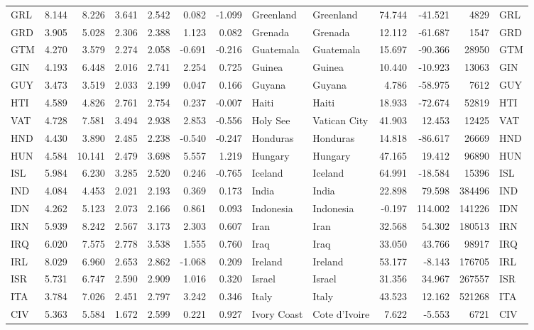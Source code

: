 \begin{tabular}{lrrrrrrllrrrl}
GRL & 8.144 & 8.226 & 3.641 & 2.542 & 0.082 & -1.099 & Greenland & Greenland & 74.744 & -41.521 & 4829 & GRL \\
GRD & 3.905 & 5.028 & 2.306 & 2.388 & 1.123 & 0.082 & Grenada & Grenada & 12.112 & -61.687 & 1547 & GRD \\
GTM & 4.270 & 3.579 & 2.274 & 2.058 & -0.691 & -0.216 & Guatemala & Guatemala & 15.697 & -90.366 & 28950 & GTM \\
GIN & 4.193 & 6.448 & 2.016 & 2.741 & 2.254 & 0.725 & Guinea & Guinea & 10.440 & -10.923 & 13063 & GIN \\
GUY & 3.473 & 3.519 & 2.033 & 2.199 & 0.047 & 0.166 & Guyana & Guyana & 4.786 & -58.975 & 7612 & GUY \\
HTI & 4.589 & 4.826 & 2.761 & 2.754 & 0.237 & -0.007 & Haiti & Haiti & 18.933 & -72.674 & 52819 & HTI \\
VAT & 4.728 & 7.581 & 3.494 & 2.938 & 2.853 & -0.556 & Holy See & Vatican City & 41.903 & 12.453 & 12425 & VAT \\
HND & 4.430 & 3.890 & 2.485 & 2.238 & -0.540 & -0.247 & Honduras & Honduras & 14.818 & -86.617 & 26669 & HND \\
HUN & 4.584 & 10.141 & 2.479 & 3.698 & 5.557 & 1.219 & Hungary & Hungary & 47.165 & 19.412 & 96890 & HUN \\
ISL & 5.984 & 6.230 & 3.285 & 2.520 & 0.246 & -0.765 & Iceland & Iceland & 64.991 & -18.584 & 15396 & ISL \\
IND & 4.084 & 4.453 & 2.021 & 2.193 & 0.369 & 0.173 & India & India & 22.898 & 79.598 & 384496 & IND \\
IDN & 4.262 & 5.123 & 2.073 & 2.166 & 0.861 & 0.093 & Indonesia & Indonesia & -0.197 & 114.002 & 141226 & IDN \\
IRN & 5.939 & 8.242 & 2.567 & 3.173 & 2.303 & 0.607 & Iran & Iran & 32.568 & 54.302 & 180513 & IRN \\
IRQ & 6.020 & 7.575 & 2.778 & 3.538 & 1.555 & 0.760 & Iraq & Iraq & 33.050 & 43.766 & 98917 & IRQ \\
IRL & 8.029 & 6.960 & 2.653 & 2.862 & -1.068 & 0.209 & Ireland & Ireland & 53.177 & -8.143 & 176705 & IRL \\
ISR & 5.731 & 6.747 & 2.590 & 2.909 & 1.016 & 0.320 & Israel & Israel & 31.356 & 34.967 & 267557 & ISR \\
ITA & 3.784 & 7.026 & 2.451 & 2.797 & 3.242 & 0.346 & Italy & Italy & 43.523 & 12.162 & 521268 & ITA \\
CIV & 5.363 & 5.584 & 1.672 & 2.599 & 0.221 & 0.927 & Ivory Coast & Cote d'Ivoire & 7.622 & -5.553 & 6721 & CIV \\

\end{tabular}
